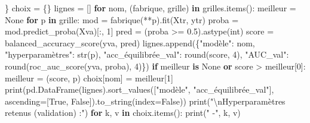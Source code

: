 \documentclass[
  10pt,
]{article}
\newenvironment{Shaded}{}{}
\newcommand{\BuiltInTok}[1]{\textcolor[rgb]{0.00,0.50,0.00}{#1}}
\newcommand{\CharTok}[1]{\textcolor[rgb]{0.25,0.44,0.63}{#1}}
\newcommand{\ControlFlowTok}[1]{\textcolor[rgb]{0.00,0.44,0.13}{\textbf{#1}}}
\newcommand{\DecValTok}[1]{\textcolor[rgb]{0.25,0.63,0.44}{#1}}
\newcommand{\FloatTok}[1]{\textcolor[rgb]{0.25,0.63,0.44}{#1}}
\newcommand{\KeywordTok}[1]{\textcolor[rgb]{0.00,0.44,0.13}{\textbf{#1}}}
\newcommand{\NormalTok}[1]{#1}
\newcommand{\OperatorTok}[1]{\textcolor[rgb]{0.40,0.40,0.40}{#1}}
\newcommand{\StringTok}[1]{\textcolor[rgb]{0.25,0.44,0.63}{#1}}
\newcommand{\VariableTok}[1]{\textcolor[rgb]{0.10,0.09,0.49}{#1}}
\begin{document}
\begin{Shaded}
\begin{Highlighting}[]
\NormalTok{\}}
\NormalTok{choix }\OperatorTok{=}\NormalTok{ \{\}}
\NormalTok{lignes }\OperatorTok{=}\NormalTok{ []}
\ControlFlowTok{for}\NormalTok{ nom, (fabrique, grille) }\KeywordTok{in}\NormalTok{ grilles.items():}
\NormalTok{    meilleur }\OperatorTok{=} \VariableTok{None}
    \ControlFlowTok{for}\NormalTok{ p }\KeywordTok{in}\NormalTok{ grille:}
\NormalTok{        mod }\OperatorTok{=}\NormalTok{ fabrique(}\OperatorTok{**}\NormalTok{p).fit(Xtr, ytr)}
\NormalTok{        proba }\OperatorTok{=}\NormalTok{ mod.predict\_proba(Xva)[:, }\DecValTok{1}\NormalTok{]}
\NormalTok{        pred }\OperatorTok{=}\NormalTok{ (proba }\OperatorTok{\textgreater{}=} \FloatTok{0.5}\NormalTok{).astype(}\BuiltInTok{int}\NormalTok{)}
\NormalTok{        score }\OperatorTok{=}\NormalTok{ balanced\_accuracy\_score(yva, pred)}
\NormalTok{        lignes.append(\{}\StringTok{"modèle"}\NormalTok{: nom, }\StringTok{"hyperparamètres"}\NormalTok{: }\BuiltInTok{str}\NormalTok{(p), }\StringTok{"acc\_équilibrée\_val"}\NormalTok{: }\BuiltInTok{round}\NormalTok{(score, }\DecValTok{4}\NormalTok{),}
                       \StringTok{"AUC\_val"}\NormalTok{: }\BuiltInTok{round}\NormalTok{(roc\_auc\_score(yva, proba), }\DecValTok{4}\NormalTok{)\})}
        \ControlFlowTok{if}\NormalTok{ meilleur }\KeywordTok{is} \VariableTok{None} \KeywordTok{or}\NormalTok{ score }\OperatorTok{\textgreater{}}\NormalTok{ meilleur[}\DecValTok{0}\NormalTok{]:}
\NormalTok{            meilleur }\OperatorTok{=}\NormalTok{ (score, p)}
\NormalTok{    choix[nom] }\OperatorTok{=}\NormalTok{ meilleur[}\DecValTok{1}\NormalTok{]}
\BuiltInTok{print}\NormalTok{(pd.DataFrame(lignes).sort\_values([}\StringTok{"modèle"}\NormalTok{, }\StringTok{"acc\_équilibrée\_val"}\NormalTok{], ascending}\OperatorTok{=}\NormalTok{[}\VariableTok{True}\NormalTok{, }\VariableTok{False}\NormalTok{]).to\_string(index}\OperatorTok{=}\VariableTok{False}\NormalTok{))}
\BuiltInTok{print}\NormalTok{(}\StringTok{"}\CharTok{\textbackslash{}n}\StringTok{Hyperparamètres retenus (validation) :"}\NormalTok{)}
\ControlFlowTok{for}\NormalTok{ k, v }\KeywordTok{in}\NormalTok{ choix.items(): }\BuiltInTok{print}\NormalTok{(}\StringTok{" {-}"}\NormalTok{, k, v)}
\end{Highlighting}
\end{Shaded}
\end{document}
